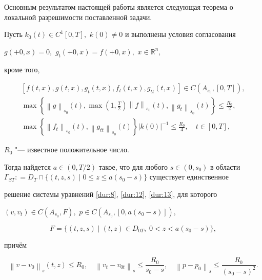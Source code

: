 Основным результатом настоящей работы является следующая теорема о локальной разрешимости поставленной задачи.



\smallskip



\begin{theorem} Пусть ${k_0}(t)\in{C^1}[0, T],$   $k(0)\ne 0$ и выполнены условия согласования

$g( + 0, x) = 0,$   ${g_t}( + 0, x) = f( + 0 ,x),$    $x \in {\mathbb R^n},$

кроме того{\rm ,}

\begin{gather*}

\left[ {f(t,x),g(t,x),{g_t}(t,x),{f_t}(t,x),{g_{tt}}(t,x)} \right] \in C({A_{{s_0}}},\left[ {0,T} \right]),

\\

\max \left\{ {{{\left\| g \right\|}_{{s_0}}}(t),\max (1,\frac{T}{2}){{\left\| f \right\|}_{{s_0}}}(t),

{{\left\| {{g_t}}

\right\|}_{{s_0}}}(t)} \right\} \leqslant \frac{{{R_0}}}{2},

\\

\max \left\{ {{{\left\| {{f_t}} \right\|}_{{s_0}}}(t),{{\left\| {{g_{tt}}} \right\|}_{{s_0}}}(t)} \right\}{\left| {k(0)}

\right|^{ - 1}} \leqslant \frac{{{R_0}}}{4},\quad  t \in \left[ {0, T} \right],

\end{gather*}

$R_0$ "--- известное  положительное число{\rm .}

Тогда найдется $a \in (0, {T}/{2})$ такое{\rm ,} что для любого $s \in (0,{s_0})$ в области ${\Gamma _{ST}}: = {D_T} \cap \{ (t, z, s) \mid {0 \leqslant z \leqslant a({s_0} - s )}\}$ существует единственное

 решение системы уравнений \eqref{dur:8}{\rm ,} \eqref{dur:12}{\rm ,} \eqref{dur:13}{\rm ,} для которого

$(v,{v_t}) \in C({A_{{s_0}}},F),$ $p \in C({A_{{s_0}}},\left[ {0,a({s_0} - s)} \right]),$

$$F = \{ (t,z,s) \mid {(t,z) \in D_{0T},} \; 0 < z < a({s_0} - s) \},$$

    причём

$${\left\| {v - {v_0}} \right\|_s}(t,z) \leqslant {R_0}, \quad  {\left\| {{v_t} - {v_{0t}}} \right\|_s}

\leqslant \frac{{{R_0}}}{{{s_0} - s}},\quad 

{\left\| {p - {p_0}} \right\|_s} \leqslant \frac{{{R_0}}}{{{{({s_0} - s)}^2}}}.$$

\end{theorem}



